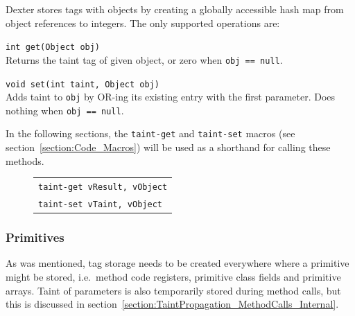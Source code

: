 \documentclass[12pt,twoside,notitlepage]{report}
\newcommand{\centerbox}[1] {
	\begin{center}
	\begin{footnotesize}
	\begin{tabular}{l}
		#1
	\end{tabular}
	\end{footnotesize}
	\end{center}
}
\newcommand{\asm}[1] {\texttt{#1}}
\begin{document}
Dexter stores tags with objects by creating a globally accessible hash map from object references to integers. The only supported operations are:
\begin{description} 
\item \verb$int get(Object obj)$ \\
Returns the taint tag of given object, or zero when \verb$obj == null$.
\item \verb$void set(int taint, Object obj)$ \\
Adds taint to \verb$obj$ by OR-ing its existing entry with the first parameter. Does nothing when \verb$obj == null$.
\end{description}

In the following sections, the \verb$taint-get$ and \verb$taint-set$ macros (see section~\ref{section:Code_Macros}) will be used as a shorthand for calling these methods. 
	\begin{figure}[H]
		\centerbox{
			\asm{taint-get vResult, vObject} \\
			\asm{taint-set vTaint, vObject}
		}
	\end{figure}

\subsubsection{Primitives}

\label{section:TaintStorage_Primitives}

As was mentioned, tag storage needs to be created everywhere where a primitive might be stored, i.e.\ method code registers, primitive class fields and primitive arrays. Taint of parameters is also temporarily stored during method calls, but this is discussed in section~\ref{section:TaintPropagation_MethodCalls_Internal}.
\end{document}
